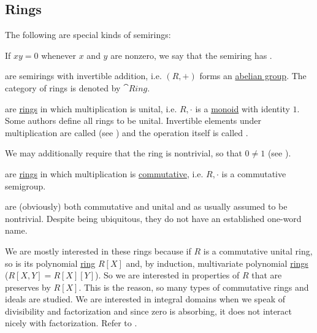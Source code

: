 \subsection{Rings}\label{subsec:rings}

\begin{definition}
  The following are special kinds of semirings:
  \begin{thmenum}[resume=def:semiring]
     If \( xy = 0 \) whenever \( x \) and \( y \) are nonzero, we say that the semiring has .

      are semirings with invertible addition, i.e. \( (R, +) \) forms an \hyperref[def:abelian_group]{abelian group}. The category of rings is denoted by \( \cat{Ring} \).

      are \hyperref[def:semiring/ring]{rings} in which multiplication is unital, i.e. \( R, \cdot \) is a \hyperref[def:monoid]{monoid} with identity \( 1 \). Some authors define all rings to be unital. Invertible elements under multiplication are called  (see ) and the operation itself is called .

    We may additionally require that the ring is nontrivial, so that \( 0 \neq 1 \) (see ).

      are \hyperref[def:semiring/ring]{rings} in which multiplication is \hyperref[def:magma/commutative]{commutative}, i.e. \( R, \cdot \) is a commutative semigroup.

      are (obviously) both commutative and unital and as usually assumed to be nontrivial. Despite being ubiquitous, they do not have an established one-word name.

    We are mostly interested in these rings because if \( R \) is a commutative unital ring, so is its polynomial \hyperref[def:algebra_of_polynomials]{ring} \( R[X] \) and, by induction, multivariate polynomial \hyperref[def:multivariate_polynomial]{rings} (\( R[X, Y] = R[X][Y] \)). So we are interested in properties of \( R \) that are preserves by \( R[X] \). This is the reason, so many types of commutative rings and ideals are studied. We are interested in integral domains when we speak of divisibility and factorization and since zero is absorbing, it does not interact nicely with factorization. Refer to .


\end{thmenum}
\end{definition}
